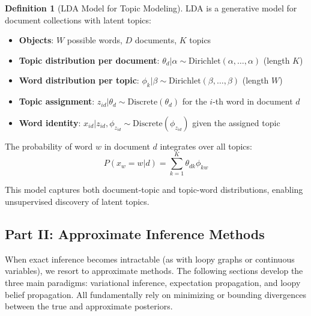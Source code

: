 \documentclass[12pt,a4paper]{article}
\theoremstyle{definition}
\newtheorem{definition}{Definition}[section]
\begin{document}
\begin{definition}[LDA Model for Topic Modeling]
LDA is a generative model for document collections with latent topics:

\begin{itemize}
    \item \textbf{Objects}: $W$ possible words, $D$ documents, $K$ topics
    
    \item \textbf{Topic distribution per document}: $\theta_d | \alpha \sim \text{Dirichlet}(\alpha, \ldots, \alpha)$ (length $K$)
    
    \item \textbf{Word distribution per topic}: $\phi_k | \beta \sim \text{Dirichlet}(\beta, \ldots, \beta)$ (length $W$)
    
    \item \textbf{Topic assignment}: $z_{id} | \theta_d \sim \text{Discrete}(\theta_d)$ for the $i$-th word in document $d$
    
    \item \textbf{Word identity}: $x_{id} | z_{id}, \phi_{z_{id}} \sim \text{Discrete}(\phi_{z_{id}})$ given the assigned topic
\end{itemize}

The probability of word $w$ in document $d$ integrates over all topics:
\[
P(x_w = w | d) = \sum_{k=1}^K \theta_{dk} \phi_{kw}
\]

This model captures both document-topic and topic-word distributions, enabling unsupervised discovery of latent topics.
\end{definition}

\newpage
\vspace*{2cm}
\begin{center}
    \section*{\Large Part II: Approximate Inference Methods}
\end{center}
\vspace*{1cm}
\nobreak

When exact inference becomes intractable (as with loopy graphs or continuous variables), we resort to approximate methods. The following sections develop the three main paradigms: variational inference, expectation propagation, and loopy belief propagation. All fundamentally rely on minimizing or bounding divergences between the true and approximate posteriors.
\end{document}
